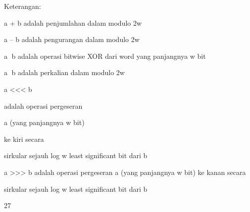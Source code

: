 \documentclass{article}
\begin{document}

Keterangan:

a + b adalah penjumlahan dalam modulo 2w

a – b adalah pengurangan dalam modulo 2w

a b adalah operasi bitwise XOR dari word yang panjangnya w bit

a b adalah perkalian dalam modulo 2w

a <<< b

adalah operasi pergeseran

a (yang panjangnya w bit)

ke kiri secara

sirkular sejauh log w least significant bit dari b

a >>> b adalah operasi pergeseran a (yang panjangnya w bit) ke kanan secara

sirkular sejauh log w least significant bit dari b

27
\end{document}
